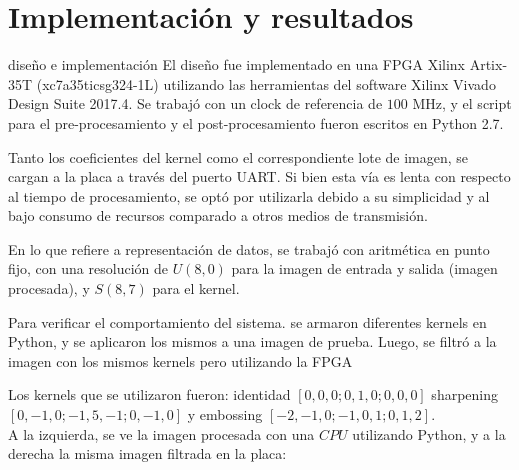 \chapter{Implementación y resultados}  \label{implementations_sec}
 diseño e implementación
El diseño fue implementado en una FPGA Xilinx Artix-35T (xc7a35ticsg324-1L) utilizando las herramientas del software
Xilinx Vivado Design Suite 2017.4. Se trabajó con un clock de referencia de $100$ MHz, y el script para el pre-procesamiento 
y el post-procesamiento fueron escritos en Python 2.7.

Tanto los coeficientes del kernel como el correspondiente lote de imagen, se cargan a la placa a través
del puerto UART. Si bien esta vía es lenta con respecto al tiempo de procesamiento, se optó por utilizarla
debido a su simplicidad y al bajo consumo de recursos comparado a otros medios de transmisión.

En lo que refiere a representación de datos, se trabajó con aritmética en punto fijo, con una
resolución de $U(8,0)$ para la imagen de entrada y salida (imagen procesada), y $S(8,7)$ para el kernel.


Para verificar el comportamiento del sistema. se armaron diferentes kernels
en Python, y se aplicaron los mismos a una imagen de prueba. Luego, 
se filtró a la imagen con los mismos kernels  pero utilizando la FPGA

Los kernels que se utilizaron fueron: identidad $[0, 0, 0; 0, 1, 0; 0, 0,
0]$ sharpening $[0, -1, 0; -1, 5, -1; 0, -1, 0]$ y embossing $[-2, -1, 0; -1,
0, 1; 0, 1, 2]$.\\


A la izquierda, se ve la imagen procesada con una $CPU$ utilizando Python, y a la derecha
la misma imagen filtrada en la placa:



